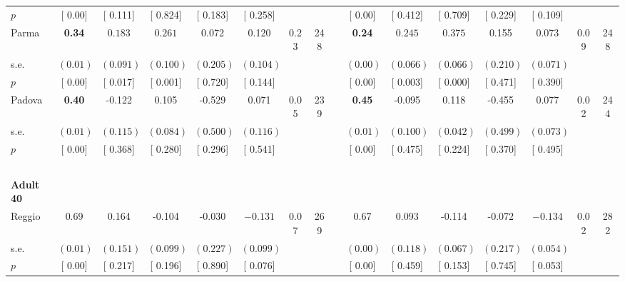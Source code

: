 \begin{longtable}{L{8em} c c c c c c c p{1em} c c c c c c c}
\quad \quad \quad \quad $ p$ & [     0.00] & [    0.111] & [    0.824] & [    0.183] & [    0.258] & & & & [     0.00] & [    0.412] & [    0.709] & [    0.229] & [    0.109] & &  \\[1em]
\quad \quad \quad Parma& \textbf{     0.34} & $ \mathbf{    0.183}$ & $ \mathbf{    0.261}$ &     0.072 &     0.120 &      0.23 &       248 & & \textbf{     0.24} & $ \mathbf{    0.245}$ & $ \mathbf{    0.375}$ &     0.155 &     0.073 &      0.09 &       248  \\*
\quad \quad \quad \quad s.e.& $ (     0.01)$ & $ (    0.091)$ & $ (    0.100)$ & $ (    0.205)$ & $ (    0.104)$ & & & & $ (     0.00)$ & $ (    0.066)$ & $ (    0.066)$ & $ (    0.210)$ & $ (    0.071)$ & &  \\*
\quad \quad \quad \quad $ p$ & [     0.00] & [    0.017] & [    0.001] & [    0.720] & [    0.144] & & & & [     0.00] & [    0.003] & [    0.000] & [    0.471] & [    0.390] & &  \\[1em]
\quad \quad \quad Padova& \textbf{     0.40} &    -0.122 &     0.105 &    -0.529 &     0.071 &      0.05 &       239 & & \textbf{     0.45} &    -0.095 &     0.118 &    -0.455 &     0.077 &      0.02 &       244  \\*
\quad \quad \quad \quad s.e.& $ (     0.01)$ & $ (    0.115)$ & $ (    0.084)$ & $ (    0.500)$ & $ (    0.116)$ & & & & $ (     0.01)$ & $ (    0.100)$ & $ (    0.042)$ & $ (    0.499)$ & $ (    0.073)$ & &  \\*
\quad \quad \quad \quad $ p$ & [     0.00] & [    0.368] & [    0.280] & [    0.296] & [    0.541] & & & & [     0.00] & [    0.475] & [    0.224] & [    0.370] & [    0.495] & &  \\[1em]
~\\[1em]
\quad \quad \textbf{Adult 40} & & & & & & & & & & & & & & & \\* 
\quad \quad \quad Reggio& 0.69 &     0.164 &    -0.104 &    -0.030 & $ \mathbf{   -0.131}$ &      0.07 &       269 & & 0.67 &     0.093 &    -0.114 &    -0.072 & $ \mathbf{   -0.134}$ &      0.02 &       282  \\*
\quad \quad \quad \quad s.e.& $ (     0.01)$ & $ (    0.151)$ & $ (    0.099)$ & $ (    0.227)$ & $ (    0.099)$ & & & & $ (     0.00)$ & $ (    0.118)$ & $ (    0.067)$ & $ (    0.217)$ & $ (    0.054)$ & &  \\*
\quad \quad \quad \quad $ p$ & [     0.00] & [    0.217] & [    0.196] & [    0.890] & [    0.076] & & & & [     0.00] & [    0.459] & [    0.153] & [    0.745] & [    0.053] & &  \\[1em]

\end{longtable}
